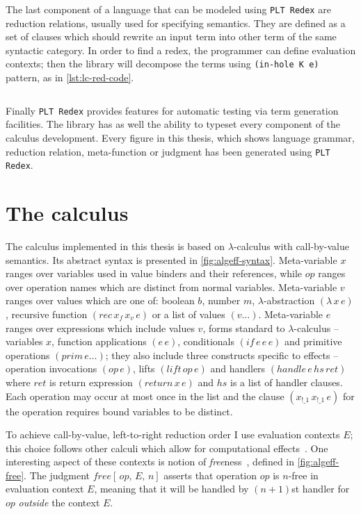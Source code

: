 \documentclass[inz, english, longabstract]{iithesis}
\newcommand{\Redex}{\texttt{PLT Redex}}
\newcommand{\LC}{\(\lambda\)-calculus}
\begin{document}
The last component of a language that can be modeled using \Redex{} are reduction relations, usually used for specifying semantics.
They are defined as a set of clauses which should rewrite an input term into other term of the same syntactic category.
In order to find a redex, the programmer can define evaluation contexts; then the library will decompose the terms using \texttt{(in-hole K e)} pattern, as in \autoref{lst:lc-red-code}.
\begin{listing}[t]
  \inputminted[firstline=19,lastline=23]{Racket}{../lc/lc.rkt}
  \caption{Reduction relation for \LC{} in \Redex{}}
  \label{lst:lc-red-code}
\end{listing}
Finally \Redex{} provides features for automatic testing via term generation facilities. The library has as well the ability to typeset every component of the calculus development.
Every figure in this thesis, which shows language grammar, reduction relation, meta-function or judgment has been generated using \Redex{}.

\chapter{The calculus}\label{ch:calculus}
The calculus implemented in this thesis is based on \LC{} with call-by-value semantics.
Its abstract syntax is presented in \autoref{fig:algeff-syntax}.
Meta-variable $ x $ ranges over variables used in value binders and their references, while $ op $ ranges over operation names which are distinct from normal variables.
Meta-variable $ v $ ranges over values which are one of: boolean $ b $, number $ m $, $ \lambda $-abstraction $(\lambda \, x \, e)$, recursive function $(rec \, x_f \, x_v \, e)$ or a list of values $(v \ldots)$.
Meta-variable $ e $ ranges over expressions which include values $ v $, forms standard to \LC{} -- variables $ x $, function applications $ (e \, e) $, conditionals $ (if \, e \,e \, e) $ and primitive operations $ (prim \, e \ldots) $; they also include three constructs specific to effects -- operation invocations $ (op \, e) $, lifts $ (lift \, op \, e) $ and handlers $ (handle \, e \, hs \, ret) $ where $ ret $ is return expression $ (return \, x \, e) $ and $ hs $ is a list of handler clauses.
Each operation may occur at most once in the list and the clause $(x_{!\_1} \, x_{!\_1} \, e)$ for the operation requires bound variables to be distinct.

To achieve call-by-value, left-to-right reduction order I use evaluation contexts $ E $; this choice follows other calculi which allow for computational effects~\cite{Biernacki2017, Leijen2014, Hillerstrom2016}.
One interesting aspect of these contexts is notion of \emph{free}ness~\cite{Biernacki2017}, defined in \autoref{fig:algeff-free}.
The judgment $ free[ \, op , \, E , \, n] $ asserts that operation $ op $ is $ n $-free in evaluation context $ E $, meaning that it will be handled by $(n + 1)$st handler for $ op $ \emph{outside} the context $ E $.
\end{document}
